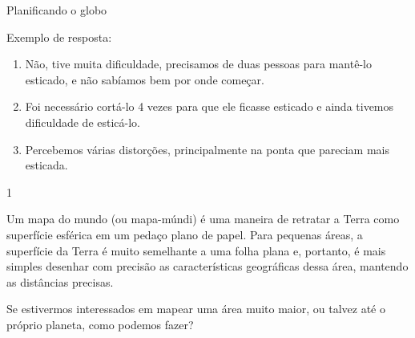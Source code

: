 \marginpar{\vspace{-\baselineskip}}
\begin{answer}{Planificando o globo}
{
  Exemplo de resposta:
  \begin{enumerate}
  \item Não, tive muita dificuldade, precisamos de duas pessoas para mantê-lo esticado, e não sabíamos bem por onde começar.
  \item Foi necessário cortá-lo 4 vezes para que ele ficasse esticado e ainda tivemos dificuldade de esticá-lo.
  \item Percebemos várias distorções, principalmente na ponta que pareciam mais esticada.
  \end{enumerate}
}{1}
\end{answer}

\label{mapamundo}
Um mapa do mundo (ou mapa-múndi) é uma maneira de retratar a Terra como superfície esférica em um pedaço plano de papel. Para pequenas áreas, a superfície da Terra é muito semelhante a uma folha plana e, portanto, é mais simples desenhar com precisão as características geográficas dessa área, mantendo as distâncias precisas.

Se estivermos interessados em mapear uma área muito maior, ou talvez até o próprio planeta, como podemos fazer?

